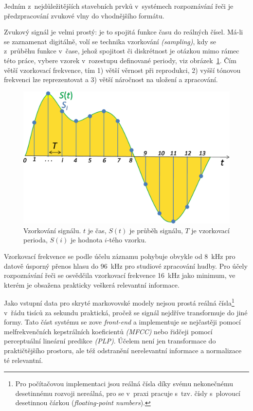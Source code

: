Jedním z~nejdůležitějších stavebních prvků v~systémech rozpoznávání řeči je
předzpracování zvukové vlny do vhodnějšího formátu.

Zvukový signál je velmi prostý: je to spojitá funkce času do reálných čísel.
Má-li se zaznamenat digitálně, volí se technika vzorkování \textit{(sampling)},
kdy se z~průběhu funkce v~čase, jehož spojitost či diskrétnost je otázkou mimo
rámec této práce, vybere vzorek v~rozestupu definované periody, viz
obrázek~\ref{fig:sampling}. Čím větší
vzorkovací frekvence, tím 1) větší věrnost při reprodukci, 2) vyšší tónovou
frekvenci lze reprezentovat a 3) větší náročnost na uložení a zpracování.

\begin{figure}[htpb]
\includegraphics[scale=0.38]{rc/Signal_Sampling.png}
\caption{
    Vzorkování signálu. $t$ je čas, $S(t)$ je průběh signálu, $T$ je vzorkovací
    perioda, $S(i)$ je hodnota $i$-tého vzorku.
}
\label{fig:sampling}
\end{figure}

Vzorkovací frekvence se podle účelu záznamu pohybuje obvykle od 8~kHz pro
datově úsporný přenos hlasu do 96~kHz pro studiové zpracování hudby. Pro účely
rozpoznávání řeči se osvědčila vzorkovací frekvence 16~kHz jako minimum, ve
kterém je obsažena prakticky veškerá relevantní informace.

Jako vstupní data pro skryté markovovské modely nejsou prostá reálná
čísla\footnote{Pro počítačovou implementaci jsou reálná čísla díky svému
nekonečnému desetinnému rozvoji nereálná, pro se v~praxi pracuje s~tzv. čísly
s~plovoucí desetinnou čárkou (\textit{floating-point numbers}).} v~řádu tisíců
za sekundu praktická, pročež se signál nejdříve transformuje do jiné formy. Tato
část systému se zove \textit{front-end} a implementuje se nejčastěji pomocí
melfrekvenčních kepstrálních koeficientů \textit{(MFCC)} nebo řidčeji pomocí
perceptuální lineární predikce \textit{(PLP)}. Účelem není jen transformace do
praktičtějšího prostoru, ale též odstranění nerelevantní informace a normalizace
té relevantní.

